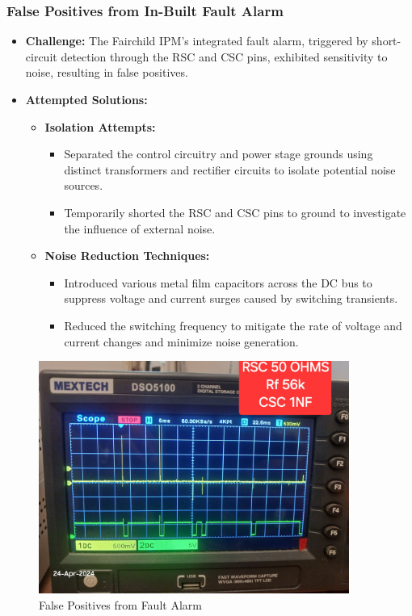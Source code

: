\subsubsection{False Positives from In-Built Fault Alarm}

\begin{itemize}
	\item \textbf{Challenge:} The Fairchild IPM's integrated fault alarm, triggered by short-circuit detection through the RSC and CSC pins, exhibited sensitivity to noise, resulting in false positives.
	\item \textbf{Attempted Solutions:}
	      \begin{itemize}
		      \item \textbf{Isolation Attempts:}
		            \begin{itemize}
			            \item Separated the control circuitry and power stage grounds using distinct transformers and rectifier circuits to isolate potential noise sources.
			            \item Temporarily shorted the RSC and CSC pins to ground to investigate the influence of external noise.
		            \end{itemize}
		      \item \textbf{Noise Reduction Techniques:}
		            \begin{itemize}
			            \item Introduced various metal film capacitors across the DC bus to suppress voltage and current surges caused by switching transients.
			            \item Reduced the switching frequency to mitigate the rate of voltage and current changes and minimize noise generation.
		            \end{itemize}
	      \end{itemize}
\end{itemize}

\begin{figure}
	\centering
	\includegraphics[width=4in]{sections/section6/images/hardwareSetup/VccNoiseAndFaultAlarm.jpg}
	\caption{False Positives from Fault Alarm}
	\label{fig:FaultAlarmNoise}
\end{figure}

